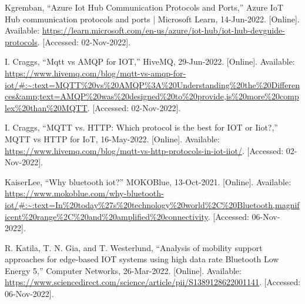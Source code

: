 \begin{thebibliography}{00}
     Kgremban, “Azure Iot Hub Communication Protocols and Ports,” Azure IoT Hub communication protocols and ports | Microsoft Learn, 14-Jun-2022. [Online]. Available: \url{https://learn.microsoft.com/en-us/azure/iot-hub/iot-hub-devguide-protocols}. [Accessed: 02-Nov-2022]. 

     I. Craggs, “Mqtt vs AMQP for IOT,” HiveMQ, 29-Jun-2022. [Online]. Available: \url{https://www.hivemq.com/blog/mqtt-vs-amqp-for-iot/#:~:text=MQTT%20vs%20AMQP%3A%20Understanding%20the%20Differences&amp;text=AMQP%20was%20designed%20to%20provide,is%20more%20complex%20than%20MQTT}. [Accessed: 02-Nov-2022]. 
    
     I. Craggs, “MQTT vs. HTTP: Which protocol is the best for IOT or Iiot?,” MQTT vs HTTP for IoT, 16-May-2022. [Online]. Available: \url{https://www.hivemq.com/blog/mqtt-vs-http-protocols-in-iot-iiot/}. [Accessed: 02-Nov-2022]. 
    
     KaiserLee, “Why bluetooth iot?” MOKOBlue, 13-Oct-2021. [Online]. Available: \url{https://www.mokoblue.com/why-bluetooth-iot/#:~:text=In%20today%27s%20technology%20world%2C%20Bluetooth,magnificent%20range%2C%20and%20amplified%20connectivity}. [Accessed: 06-Nov-2022]. 
    
     R. Katila, T. N. Gia, and T. Westerlund, “Analysis of mobility support approaches for edge-based IOT systems using high data rate Bluetooth Low Energy 5,” Computer Networks, 26-Mar-2022. [Online]. Available: \url{https://www.sciencedirect.com/science/article/pii/S1389128622001141}. [Accessed: 06-Nov-2022]. 
\end{thebibliography}